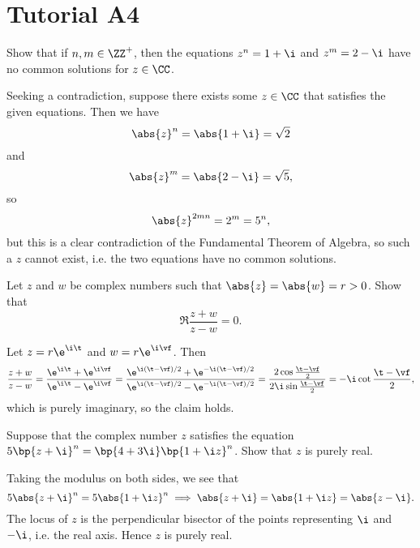 \section{Tutorial A4}

\begin{problem}
    Show that if $n, m \in \ZZ^+$, then the equations $z^n = 1 + \i$ and $z^m = 2 - \i$ have no common solutions for $z \in \CC$.
\end{problem}
\begin{solution}
    Seeking a contradiction, suppose there exists some $z \in \CC$ that satisfies the given equations. Then we have \[\abs{z}^n = \abs{1 + \i} = \sqrt{2}\] and \[\abs{z}^m = \abs{2 - \i} = \sqrt{5},\] so \[\abs{z}^{2mn} = 2^m = 5^n,\] but this is a clear contradiction of the Fundamental Theorem of Algebra, so such a $z$ cannot exist, i.e. the two equations have no common solutions.
\end{solution}

\begin{problem}
    Let $z$ and $w$ be complex numbers such that $\abs{z} = \abs{w} = r > 0$. Show that \[\Re{\frac{z+w}{z-w}} = 0.\]
\end{problem}
\begin{solution}
    Let $z = r \e^{\i \t}$ and $w = r \e^{\i \vf}$. Then \[\frac{z + w}{z - w} = \frac{\e^{\i \t} + \e^{\i \vf}}{\e^{\i \t} - \e^{\i \vf}} = \frac{\e^{\i (\t - \vf)/2} + \e^{-\i (\t - \vf)/2}}{\e^{\i (\t - \vf)/2} - \e^{-\i (\t - \vf)/2}} = \frac{2\cos{\frac{\t - \vf}2}}{2\i \sin{\frac{\t - \vf}2}} = -\i \cot{\frac{\t - \vf}{2}},\] which is purely imaginary, so the claim holds.
\end{solution}

\begin{problem}
    Suppose that the complex number $z$ satisfies the equation $5\bp{z + \i}^n = \bp{4 + 3\i} \bp{1 + \i z}^n$. Show that $z$ is purely real.
\end{problem}
\begin{solution}
    Taking the modulus on both sides, we see that \[5 \abs{z + \i}^n = 5 \abs{1 + \i z}^n \implies \abs{z + \i} = \abs{1 + \i z} = \abs{z - \i}.\] The locus of $z$ is the perpendicular bisector of the points representing $\i$ and $-\i$, i.e. the real axis. Hence $z$ is purely real.
\end{solution}

